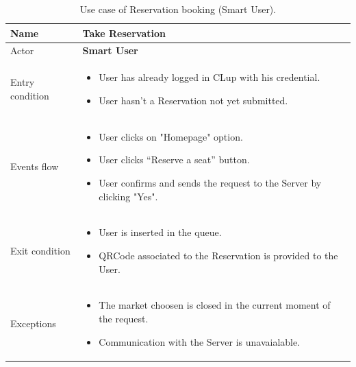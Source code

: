 \begin{table}[H]\begin{tabular}{|p{5cm} | p{7cm} | }
	\hline
	Name & \textbf{Take Reservation} \\
	\hline
	Actor & \textbf{Smart User} \\
	\hline
	Entry condition &
	\begin{itemize}
		\item User has already logged in CLup with his credential. 
		\item User hasn't a Reservation not yet submitted. 
	\end{itemize} \\
	\hline
	Events flow & 
	\begin{itemize}
		\item User clicks on "Homepage" option.
		\item User clicks “Reserve a seat” button.
		\item User confirms and sends the request to the Server by clicking "Yes".
	\end{itemize} \\
	\hline
	Exit condition &
	\begin{itemize}	
		\item User is inserted in the queue.
		\item QRCode associated to the Reservation is provided to the User. 
	\end{itemize} \\
	\hline 
	Exceptions & \begin{itemize}
    \item The market choosen is closed in the current moment of the request.
    \item Communication with the Server is unavaialable.
    \end{itemize}
 \\
	\hline
\end{tabular}
\caption{Use case of Reservation booking (Smart User).}
\end{table}

\pagebreak

